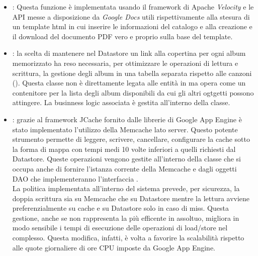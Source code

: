 \begin{itemize}
  \item {} : Questa funzione \`e implementata usando il
  framework di Apache \emph{Velocity} e le API messe a disposizione da
  \emph{Google Docs} utili rispettivamente alla stesura di un template html in
  cui inserire le informazioni del catalogo e alla creazione e il download del
  documento PDF vero e proprio sulla base del template.
  
  
  \item {} : la scelta di mantenere nel
  Datastore un link alla copertina per ogni album memorizzato ha reso necessaria, per
  ottimizzare le operazioni di lettura e scrittura, la gestione degli album in
  una tabella separata rispetto alle canzoni (). Questa classe non \`e
  direttamente legata alle entit\`a in  ma opera come un contenitore
  per la lista degli album disponibili da cui gli altri ogtgetti possono
  attingere. La businness logic associata \`e gestita all'interno della classe.
  
  \item {} : grazie al framework
  JCache fornito dalle librerie di Google App Engine \`e stato implementato
  l'utilizzo della Memcache lato server. Questo potente strumento permette di
  leggere, scrivere, cancellare, configurare la cache sotto la forma di mappa
  con tempi medi 10 volte inferiori a quelli richiesti dal Datastore. Queste
  operazioni vengono gestite all'interno della classe  che si
  occupa anche di fornire l'istanza corrente della Memcache e dagli oggetti DAO
  che implementeranno l'interfaccia . \\
  La politica implementata all'interno del sistema prevede, per sicurezza, la
  doppia scrittura sia su Memcache che su Datastore mentre la lettura avviene
  preferenzialmente su cache e su Datastore solo in caso di miss. Questa
  gestione, anche se non rappresenta la pi\`u efficente in assoltuo, migliora in
  modo sensibile i tempi di esecuzione delle operazioni di load/store nel
  complesso. Questa modifica, infatti, \`e volta a favorire la scalabilit\`a
  rispetto alle quote giornaliere di ore CPU imposte da Google App Engine.
\end{itemize}

\newpage
